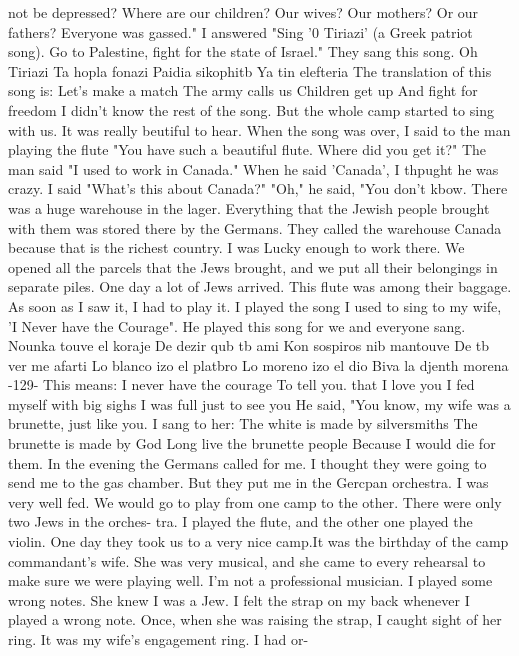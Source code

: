 not be depressed? Where are our children? Our wives? Our mothers? Or our fathers? 
Everyone was gassed." 
I answered "Sing '0 Tiriazi' (a Greek patriot song). Go to Palestine, fight for 
the state of Israel." They sang this song. 
Oh Tiriazi 
Ta hopla fonazi 
Paidia sikophitb 
Ya tin elefteria 
The translation of this song is: 
Let's make a match 
The army calls us 
Children get up 
And fight for freedom 
I didn't know the rest of the song. But the whole camp started to sing with us. It 
was really beutiful to hear. When the song was over, I said to the man playing the 
flute "You have such a beautiful flute. Where did you get it?" The man said "I used 
to work in Canada." When he said 'Canada', I thpught he was crazy. I said "What's 
this about Canada?" "Oh," he said, "You don't kbow. There was a huge warehouse in the 
lager. Everything that the Jewish people brought with them was stored there by the 
Germans. They called the warehouse Canada because that is the richest country. I was 
Lucky enough to work there. We opened all the parcels that the Jews brought, and we 
put all their belongings in separate piles. One day a lot of Jews arrived. This flute 
was among their baggage. As soon as I saw it, I had to play it. I played the song 
I used to sing to my wife, 'I Never have the Courage". He played this song for we 
and everyone sang. 
Nounka touve el koraje 
De dezir qub tb ami 
Kon sospiros nib mantouve 
De tb ver me afarti 
Lo blanco izo el platbro 
Lo moreno izo el dio 
Biva la djenth morena 
-129- 
This means: 
I never have the courage 
To tell you. that I love you 
I fed myself with big sighs 
I was full just to see you 
He said, "You know, my wife was a brunette, just like you. I sang to her: 
The white is made by silversmiths 
The brunette is made by God 
Long live the brunette people 
Because I would die for them. 
In the evening the Germans called for me. I thought they were going to send me to 
the gas chamber. But they put me in the Gercpan orchestra. I was very well fed. We 
would go to play from one camp to the other. There were only two Jews in the orches-
tra. I played the flute, and the other one played the violin. One day they took us 
to a very nice camp.It was the birthday of the camp commandant's wife. She was very 
musical, and she came to every rehearsal to make sure we were playing well. I'm 
not a professional musician. I played some wrong notes. She knew I was a Jew. I 
felt the strap on my back whenever I played a wrong note. Once, when she was raising 
the strap, I caught sight of her ring. It was my wife's engagement ring. I had or-
